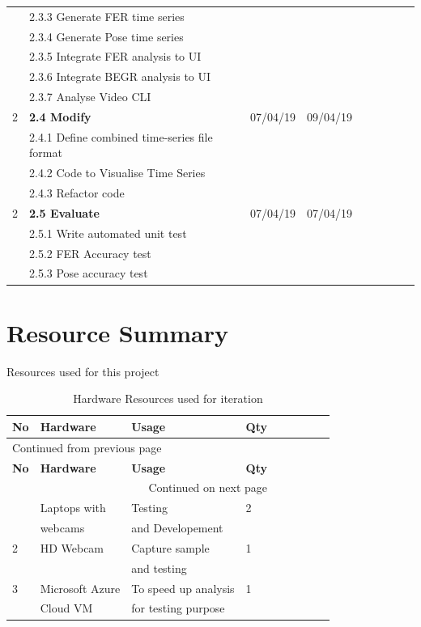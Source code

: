 \documentclass[12pt,a4paper,man]{report}
\begin{document}
\begin{longtable}{|l|l|l|l|l|l|l|lp{3cm}|}
 & 2.3.3 Generate FER time series &  &  & \\
 & 2.3.4 Generate Pose time series &  &  & \\
 & 2.3.5 Integrate FER analysis to UI &  &  & \\
 & 2.3.6 Integrate BEGR analysis to UI &  &  & \\
 & 2.3.7 Analyse Video CLI &  &  & \\
\hline
2 & \textbf{2.4 Modify} & 07/04/19 & 09/04/19 & \\
 & 2.4.1 Define combined time-series file format &  &  & \\
 & 2.4.2 Code to Visualise Time Series &  &  & \\
 & 2.4.3 Refactor code &  &  & \\
\hline
2 & \textbf{2.5 Evaluate} & 07/04/19 & 07/04/19 & \\
 & 2.5.1 Write automated unit test &  &  & \\
 & 2.5.2 FER Accuracy test &  &  & \\
 & 2.5.3 Pose accuracy test &  &  & \\
\hline
\end{longtable}


\section{Resource Summary}
\label{sec:orgfce9b40}
Resources used for this project
\begin{longtable}{|l|l|l|l|l|l|l|lp{3cm}|}
\caption{\label{table: hard_ressumm}
Hardware Resources used for iteration}
\\
\hline
\textbf{No} & \textbf{Hardware} & \textbf{Usage} & \textbf{Qty}\\
\hline
\endfirsthead
\multicolumn{4}{l}{Continued from previous page} \\
\hline

\textbf{No} & \textbf{Hardware} & \textbf{Usage} & \textbf{Qty} \\

\hline
\endhead
\hline\multicolumn{4}{r}{Continued on next page} \\
\endfoot
\endlastfoot
\hline
1 & Laptops with & Testing & 2\\
 & webcams & and Developement & \\
\hline
2 & HD Webcam & Capture sample & 1\\
 &  & and testing & \\
\hline
3 & Microsoft Azure & To speed up analysis & 1\\
 & Cloud VM & for testing purpose & \\
\hline
\end{longtable}
\end{document}
